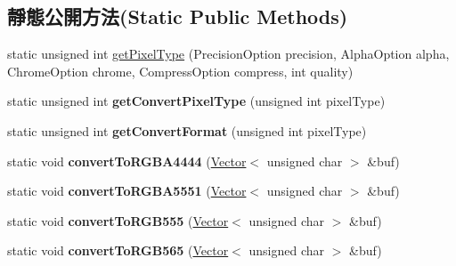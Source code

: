 \subsection*{靜態公開方法(Static Public Methods)}
\begin{DoxyCompactItemize}
\item 
static unsigned int \hyperlink{class_magnum_1_1_p_v_r_tex_convert_a5edbc87a4b04d6ff8bc02b2c0069c968}{get\+Pixel\+Type} (Precision\+Option precision, Alpha\+Option alpha, Chrome\+Option chrome, Compress\+Option compress, int quality)
\item 
static unsigned int {\bfseries get\+Convert\+Pixel\+Type} (unsigned int pixel\+Type)\hypertarget{class_magnum_1_1_p_v_r_tex_convert_aa0e9a4676a4027338c93388bc7c1c3d3}{}\label{class_magnum_1_1_p_v_r_tex_convert_aa0e9a4676a4027338c93388bc7c1c3d3}

\item 
static unsigned int {\bfseries get\+Convert\+Format} (unsigned int pixel\+Type)\hypertarget{class_magnum_1_1_p_v_r_tex_convert_a06e5b3898d421b466ff3e4ce934554eb}{}\label{class_magnum_1_1_p_v_r_tex_convert_a06e5b3898d421b466ff3e4ce934554eb}

\item 
static void {\bfseries convert\+To\+R\+G\+B\+A4444} (\hyperlink{class_magnum_1_1_vector}{Vector}$<$ unsigned char $>$ \&buf)\hypertarget{class_magnum_1_1_p_v_r_tex_convert_a085b2ef4fcbe7cdb2bf15815ba54456f}{}\label{class_magnum_1_1_p_v_r_tex_convert_a085b2ef4fcbe7cdb2bf15815ba54456f}

\item 
static void {\bfseries convert\+To\+R\+G\+B\+A5551} (\hyperlink{class_magnum_1_1_vector}{Vector}$<$ unsigned char $>$ \&buf)\hypertarget{class_magnum_1_1_p_v_r_tex_convert_af1af9c4cdbd057ecab7c7d2cafb8fb5b}{}\label{class_magnum_1_1_p_v_r_tex_convert_af1af9c4cdbd057ecab7c7d2cafb8fb5b}

\item 
static void {\bfseries convert\+To\+R\+G\+B555} (\hyperlink{class_magnum_1_1_vector}{Vector}$<$ unsigned char $>$ \&buf)\hypertarget{class_magnum_1_1_p_v_r_tex_convert_a35d89f258a307cb0e10d184d41befcac}{}\label{class_magnum_1_1_p_v_r_tex_convert_a35d89f258a307cb0e10d184d41befcac}

\item 
static void {\bfseries convert\+To\+R\+G\+B565} (\hyperlink{class_magnum_1_1_vector}{Vector}$<$ unsigned char $>$ \&buf)\hypertarget{class_magnum_1_1_p_v_r_tex_convert_aea30d698e2e5d00b9b09de9f51558c61}{}\label{class_magnum_1_1_p_v_r_tex_convert_aea30d698e2e5d00b9b09de9f51558c61}


\end{DoxyCompactItemize}

